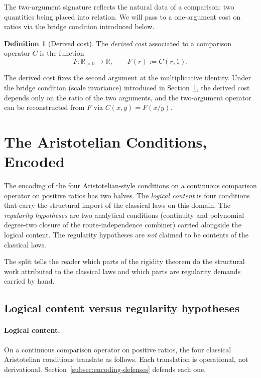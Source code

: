 \documentclass[11pt,a4paper]{article}
\theoremstyle{definition}
\newtheorem{definition}[theorem]{Definition}
\theoremstyle{remark}
\begin{document}
The two-argument signature reflects the natural data of a comparison: two
quantities being placed into relation. We will pass to a one-argument cost
on ratios via the bridge condition introduced below.

\begin{definition}[Derived cost]
\label{def:derived-cost}
The \emph{derived cost} associated to a comparison operator $C$ is the
function
\[
F : \mathbb{R}_{>0} \longrightarrow \mathbb{R}, \qquad
F(r) := C(r, 1).
\]
\end{definition}

The derived cost fixes the second argument at the multiplicative identity.
Under the bridge condition (scale invariance) introduced in
Section~\ref{sec:conditions}, the derived cost depends only on the ratio of
the two arguments, and the two-argument operator can be reconstructed
from $F$ via $C(x, y) = F(x/y)$.

\section{The Aristotelian Conditions, Encoded}\label{sec:conditions}

The encoding of the four Aristotelian-style conditions on a continuous
comparison operator on positive ratios has two halves. The
\emph{logical content} is four conditions that carry the structural
import of the classical laws on this domain. The \emph{regularity
hypotheses} are two analytical conditions (continuity and polynomial
degree-two closure of the route-independence combiner) carried
alongside the logical content. The regularity hypotheses are
\emph{not} claimed to be contents of the classical laws.

The split tells the reader which parts of the rigidity theorem do the
structural work attributed to the classical laws and which parts are
regularity demands carried by hand.

\subsection{Logical content versus regularity hypotheses}\label{subsec:logical-vs-regularity}

\paragraph{Logical content.} On a continuous comparison operator on
positive ratios, the four classical Aristotelian conditions translate
as follows. Each translation is operational, not derivational.
Section~\ref{subsec:encoding-defenses} defends each one.
\end{document}
